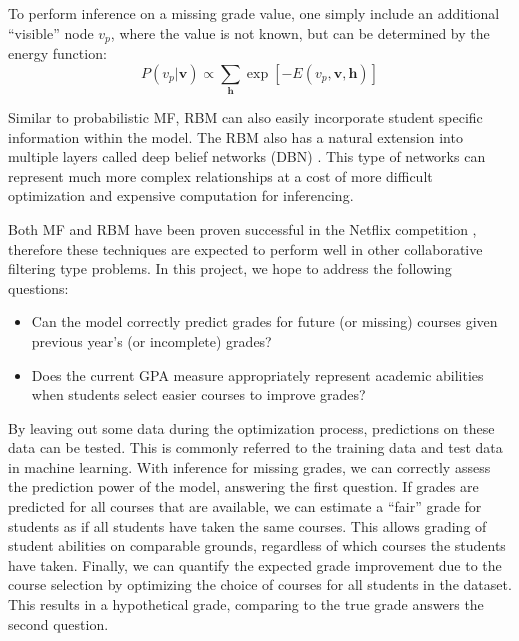 \documentclass[12pt]{article}
\begin{document}
To perform inference on a missing grade value,
one simply include an additional ``visible'' node $v_p$,
where the value is not known, 
but can be determined by the energy function:
%
\begin{equation}
    P(v_p|\mathbf{v}) \propto
        \displaystyle\sum_{\mathbf{h}} 
        \exp[-E(v_p,\mathbf{v},\mathbf{h})]
\end{equation}

Similar to probabilistic MF, RBM can also easily incorporate
student specific information within the model.
The RBM also has a natural extension into multiple layers
called deep belief networks (DBN) \cite{Sa09}.
This type of networks can represent much more complex 
relationships at a cost of more difficult optimization
and expensive computation for inferencing.

Both MF and RBM have been proven successful in 
the Netflix competition \cite{FeHeKh12}, 
therefore these techniques are expected to perform well 
in other collaborative filtering type problems.
In this project, we hope to address the following questions:
%
\begin{itemize} \itemsep0pt \parskip0pt
    \item Can the model correctly predict
        grades for future (or missing) courses given 
        previous year's (or incomplete) grades?
    \item Does the current GPA measure appropriately represent
        academic abilities when students select easier courses to 
        improve grades?
\end{itemize}

By leaving out some data during the optimization process,
predictions on these data can be tested.
This is commonly referred to the training data and test data
in machine learning.
With inference for missing grades, 
we can correctly assess the prediction power of the model,
answering the first question.
If grades are predicted for all courses that are available,
we can estimate a ``fair'' grade for students as if 
all students have taken the same courses.
This allows grading of student abilities on comparable grounds,
regardless of which courses the students have taken.
Finally, we can quantify the expected grade improvement 
due to the course selection by optimizing 
the choice of courses for all students in the dataset.
This results in a hypothetical grade,
comparing to the true grade answers the second question.
\end{document}
